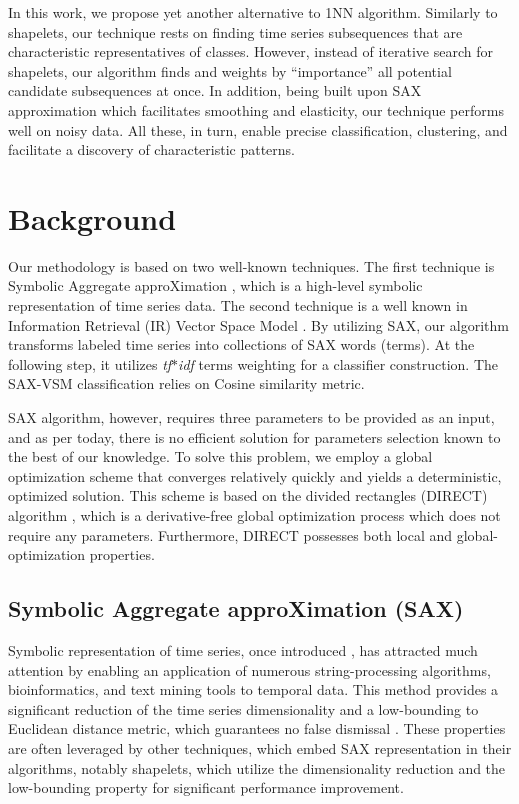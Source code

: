 \documentclass{llncs}
\begin{document}
In this work, we propose yet another alternative to 1NN algorithm. Similarly to shapelets, our
technique rests on finding time series subsequences that are characteristic representatives of
classes. 
However, instead of iterative search for shapelets, our algorithm finds and weights by
``importance'' all potential candidate subsequences at once. 
In addition, being built upon SAX approximation which facilitates smoothing and elasticity, 
our technique performs well on noisy data.
All these, in turn, enable precise classification, clustering, and facilitate a discovery of 
characteristic patterns.

\section{Background}
Our methodology is based on two well-known techniques. The first technique is 
Symbolic Aggregate approXimation \cite{sax}, which is a high-level symbolic representation 
of time series data. The second technique is a well known in Information Retrieval (IR) 
Vector Space Model \cite{salton}. 
By utilizing SAX, our algorithm transforms labeled time series into collections of SAX 
words (terms). At the following step, it utilizes \textit{tf$\ast$idf} terms weighting for a 
classifier construction. The SAX-VSM classification relies on Cosine similarity metric.

SAX algorithm, however, requires three parameters to be provided as an input, and as per 
today, there is no efficient solution for parameters selection known to the best of our knowledge. 
To solve this problem, we employ a global optimization scheme that converges relatively quickly 
and yields a deterministic, optimized solution. 
This scheme is based on the divided rectangles (DIRECT) algorithm \cite{direct}, which is
a derivative-free global optimization process which does not require any parameters.
Furthermore, DIRECT possesses both local and global-optimization properties. 

\enlargethispage{0.5cm} 
\subsection{Symbolic Aggregate approXimation (SAX)}
Symbolic representation of time series, once introduced \cite{sax}, has attracted much attention by
enabling an application of numerous string-processing algorithms, bioinformatics, and text mining 
tools to temporal data. This method provides a significant reduction of the time series 
dimensionality and a low-bounding to Euclidean distance metric, which guarantees no false 
dismissal \cite{hot_sax}.
These properties are often leveraged by other techniques, which embed SAX representation in their
algorithms, notably shapelets, which \cite{fast-shapelets} utilize the dimensionality reduction and 
the low-bounding property for significant performance improvement.
\end{document}

